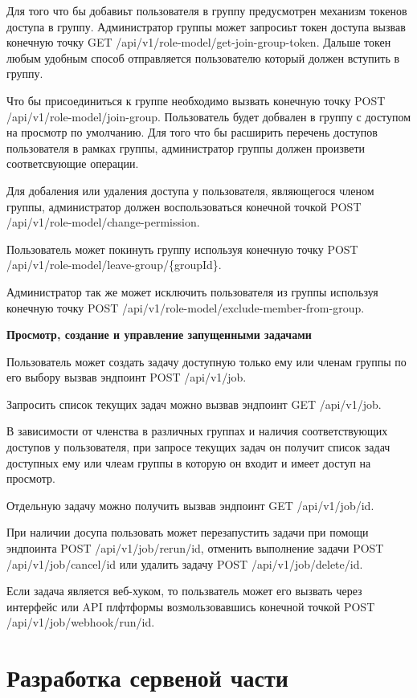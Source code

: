 Для того что бы добавиьт пользователя в группу предусмотрен механизм токенов доступа в группу.
Администратор группы может запросиьт токен доступа вызвав конечную точку GET /api/v1/role-model/get-join-group-token.
Дальше токен любым удобным способ отправляется пользователю который должен вступить в группу.

Что бы присоединиться к группе необходимо вызвать конечную точку POST /api/v1/role-model/join-group.
Пользователь будет добвален в группу с доступом на просмотр по умолчанию.
Для того что бы расширить перечень доступов пользователя в рамках группы, администратор группы должен произвети соответсвующие операции.

Для добаления или удаления доступа у пользователя, являющегося членом группы, администратор должен воспользоваться конечной точкой POST /api/v1/role-model/change-permission.

Пользователь может покинуть группу используя конечную точку POST /api/v1/role-model/leave-group/\{groupId\}.

Администратор так же может исключить пользователя из группы используя конечную точку POST /api/v1/role-model/exclude-member-from-group.

{\bf Просмотр, создание и управление запущенными задачами }

Пользователь может создать задачу доступную только ему или членам группы по его выбору вызвав эндпоинт POST /api/v1/job.

Запросить список текущих задач можно вызвав эндпоинт GET /api/v1/job.

В зависимости от членства в различных группах и наличия соответствующих доступов у пользователя, при запросе текущих задач он получит список задач доступных ему или члеам группы в которую он входит и имеет доступ на просмотр.

Отдельную задачу можно получить вызвав эндпоинт GET /api/v1/job/{id}.

При наличии досупа пользовать может перезапустить задачи при помощи эндпоинта POST /api/v1/job/rerun/{id}, отменить выполнение задачи POST /api/v1/job/cancel/{id} или удалить задачу POST /api/v1/job/delete/{id}.

Если задача является веб-хуком, то пользватель может его вызвать через интерфейс или API плфтформы возмользовавшись конечной точкой POST /api/v1/job/webhook/run/{id}.

\section{Разработка сервеной части}

